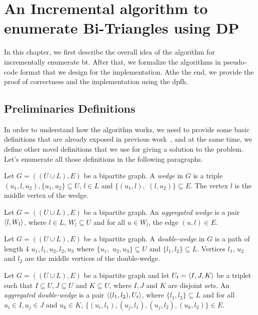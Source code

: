 \chapter{An Incremental algorithm to enumerate Bi-Triangles using DP}\label{incr-algo-bt-dp}
In this chapter, we first describe the overall idea of the algorithm for incrementally enumerate 
\acrshort{bt}. After that, we formalize the algorithms in pseudo-code format that we design for the implementation.
Athe the end, we provide the proof of correctness and the implementation using the \acrshort{dpfh}.  

\section{Preliminaries Definitions}
In order to understand how the algorithm works, we need to provide some basic definitions that are already exposed in previous work~\cite{btcount}, and
at the same time, we define other novel definitions that we use for giving a solution to the problem.
Let's enumerate all those definitions in the following paragraphs.

\begin{definition}[\acrfull{wg}]
Let $G=((U\cup L),E)$ be a bipartite graph. A  \textit{wedge} in $G$ is a triple $(u_1,l,u_2), \{u_1,u_2\}\subseteq U$, $l \in L$ and $\{(u_1,l),$ $(l,u_2)\} \subseteq E$. The vertex $l$ is the middle vertex of the wedge. 
\end{definition}

\begin{definition}\label{def:awg}
Let $G=((U\cup L),E)$ be a bipartite graph. An  \textit{aggregated wedge} is a pair $\left\langle l, W_l \right\rangle$, where $l \in L$, $W_l \subseteq U$ and for all $u\in W_l$, the edge  $(u,l)\in E$. 
\end{definition}

\begin{definition}
Let $G=((U\cup L),E)$ be a bipartite graph. A \textit{double-wedge} in $G$ is a path of length 4 $u_1,l_1,u_2,l_2,u_3$ where  $\{u_1,$ $u_2,u_3\}\subseteq U$ and $\{l_1,l_2\}\subseteq L$. Vertices $l_1$, $u_2$ and $l_2$ are the middle vertices of the double-wedge. 
\end{definition}
  
\begin{definition}\label{def:adwg}
Let $G=((U\cup L),E)$ be a bipartite graph and let $U_t = \left\langle I, J, K\right\rangle$ be a triplet such that $I \subseteq U, J \subseteq U$ and $K \subseteq U$, where $I, J$ and $K$ are disjoint sets. 
An \textit{aggregated double-wedge}  is a pair  $\left\langle (l_1, l_2), U_t \right\rangle$, where $\{l_1,l_2\}\subseteq L$ and  for all $u_i \in I, u_j \in J$ and $u_k \in K$, $\{(u_i, l_1), (u_j, l_1), (u_j, l_2), (u_k, l_2)\} \in E$.
\end{definition}

